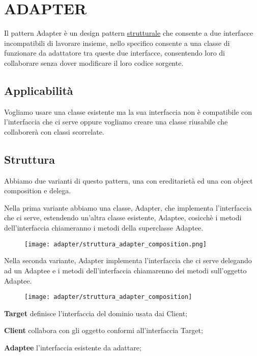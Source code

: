 \chapter{ADAPTER}

Il pattern Adapter è un design pattern \underline{strutturale} che consente a due interfacce incompatibili di lavorare insieme, nello specifico consente a una classe di 
funzionare da adattatore tra queste due interfacce, consentendo loro di collaborare senza dover modificare il loro codice sorgente.

\section{Applicabilità}

Vogliamo usare una classe esistente ma la sua interfaccia non è compatibile con l'interfaccia che ci serve oppure vogliamo creare una classe riusabile che collaborerà 
con classi scorrelate.

\section{Struttura}

Abbiamo due varianti di questo pattern, una con ereditarietà ed una con object composition e delega.

Nella prima variante abbiamo una classe, Adapter, che implementa l'interfaccia che ci serve, estendendo un'altra classe esistente, Adaptee, cosicchè i metodi 
dell'interfaccia chiameranno i metodi della superclasse Adaptee.

\begin{figure}[H]
    \centering 
    \texttt{[image: adapter/struttura\_adapter\_composition.png]}    
\end{figure}

Nella seconda variante, Adapter implementa l'interfaccia che ci serve delegando ad un Adaptee e i metodi dell'interfaccia chiamarenno dei metodi sull'oggetto Adaptee.
\begin{figure}[H]
    \centering
    \texttt{[image: adapter/struttura\_adapter\_composition]}
\end{figure}

\textbf{Target} definisce l'interfaccia del dominio usata dai Client;

\textbf{Client} collabora con gli oggetto conformi all'interfaccia Target;

\textbf{Adaptee} l'interfaccia esistente da adattare;

